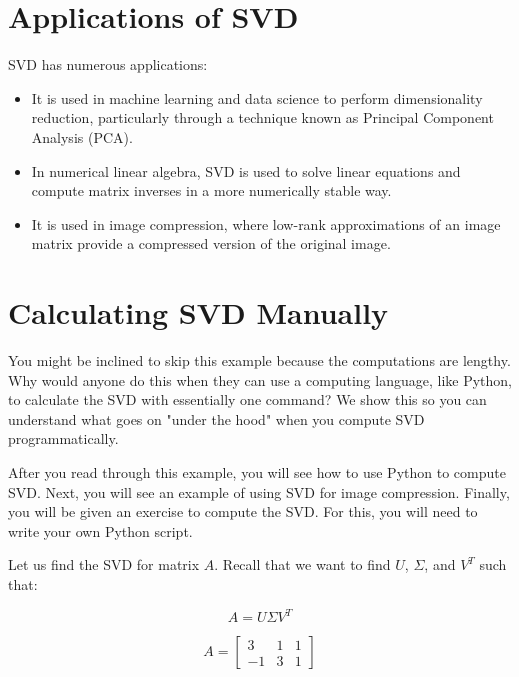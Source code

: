 \section{Applications of SVD}

SVD has numerous applications:
\begin{itemize}
\item It is used in machine learning and data science to perform
  dimensionality reduction, particularly through a technique known as
  Principal Component Analysis (PCA).
\item In numerical linear algebra, SVD is used to solve linear
  equations and compute matrix inverses in a more numerically stable
  way.
\item It is used in image compression, where low-rank approximations of an image matrix provide a compressed version of the original image. 
\end{itemize}

\section{Calculating SVD Manually}
You might be inclined to skip this example because the computations are lengthy. Why would anyone do this when they can use a computing language, like Python, to calculate the SVD with essentially one command? We show this so you can understand what goes on "under the hood" when you compute SVD programmatically. 

After you read through this example, you will see how to use Python to compute SVD. Next, you will see an example of using SVD for image compression. Finally, you will be given an exercise to compute the SVD. For this, you will need to write your own Python script.

Let us find the SVD for matrix $A$. Recall that we want to find $U$, $\Sigma$, and $V^T$ such that:

\begin{equation}
A = U \Sigma V^T
\end{equation}

$$ A = \begin{bmatrix}
3 & 1 & 1  \\
 -1 & 3 & 1 
\end{bmatrix}$$

